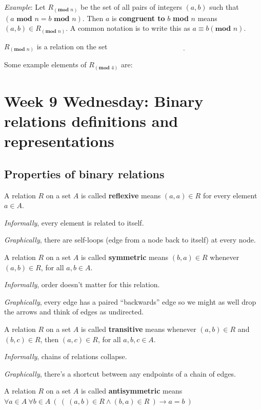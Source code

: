 \documentclass[12pt, oneside]{article}
\begin{document}
\vfill

{\it Example}: Let $R_{(\textbf{mod } n)}$ be the set of all pairs of integers $(a, b)$ such that $(a \textbf{ mod } n = b \textbf{ mod } n)$.
Then $a$ is {\bf congruent to} $b$ \textbf{mod} $n$ means $(a, b) \in R_{(\textbf{mod } n)}$. A common notation is to write this as $a \equiv b (\textbf{mod } n)$.


$R_{(\textbf{mod } n)}$ is a relation on the set $\underline{\phantom{\mathbb{Z}}\hspace{20em}}$


Some example elements of $R_{(\textbf{mod } 4)}$ are: 

\vfill \newpage
\section*{Week 9 Wednesday: Binary relations definitions and representations}
\subsection*{Properties of binary relations}


A relation $R$ on a set $A$ is called {\bf reflexive} 
means $(a, a) \in R$ for every element $a \in A$. 
 

{\it Informally}, every element is related to itself.

{\it Graphically}, there are self-loops (edge from a node back to itself) at 
every node. \vfill


A relation $R$ on a set $A$ is called {\bf symmetric} means 
$(b, a) \in R$ whenever $(a, b) \in R$, for all $a, b \in A$. 
 

{\it Informally}, order doesn't matter for this relation.

{\it Graphically}, every edge has a paired ``backwards'' edge so we might
as well drop the arrows and think of edges as undirected. \vfill


A relation $R$ on a set $A$ is called {\bf transitive} means 
whenever $(a, b) \in R$ and $(b, c) \in R$, then $(a, c) \in R$, for all $a, b, c \in A$.
 

{\it Informally}, chains of relations collapse.

{\it Graphically}, there's a shortcut between any endpoints of a chain of 
edges. \vfill


A relation $R$ on a set $A$ is called {\bf antisymmetric} means 
$\forall a \in A ~\forall b \in A~\left(~\left( ~(a,b) \in R \land (b,a) \in R ~\right) \to a=b~\right)$
 
\end{document}
